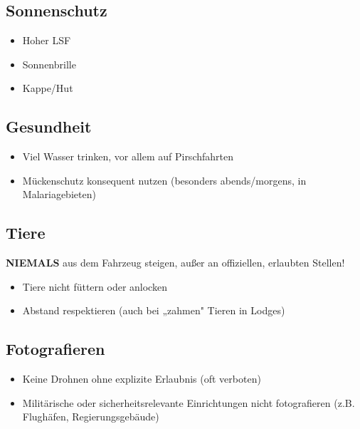\documentclass[12pt,a4paper]{article}
\begin{document}
\subsection{Sonnenschutz}

\begin{itemize}[leftmargin=*,label={\color{sungold}\faSun}]
    \item Hoher LSF
    \item Sonnenbrille
    \item Kappe/Hut
\end{itemize}

\subsection{Gesundheit}

\begin{itemize}[leftmargin=*,label={\color{mainblue}\faHeartbeat}]
    \item Viel Wasser trinken, vor allem auf Pirschfahrten
    \item Mückenschutz konsequent nutzen (besonders abends/morgens, in Malariagebieten)\cite{osir-3}
\end{itemize}

\subsection{Tiere}

\begin{warnbox}
\textbf{\faExclamationTriangle \hspace{0.2cm} NIEMALS} aus dem Fahrzeug steigen, außer an offiziellen, erlaubten Stellen!
\end{warnbox}

\vspace{0.3cm}

\begin{itemize}[leftmargin=*,label={\color{darkgreen}\faPaw}]
    \item Tiere nicht füttern oder anlocken
    \item Abstand respektieren (auch bei „zahmen" Tieren in Lodges)
\end{itemize}

\subsection{Fotografieren}

\begin{itemize}[leftmargin=*,label={\color{deeppurple}\faCamera}]
    \item Keine Drohnen ohne explizite Erlaubnis (oft verboten)
    \item Militärische oder sicherheitsrelevante Einrichtungen nicht fotografieren (z.B. Flughäfen, Regierungsgebäude)\cite{accept-reisen-1}
\end{itemize}
\end{document}
